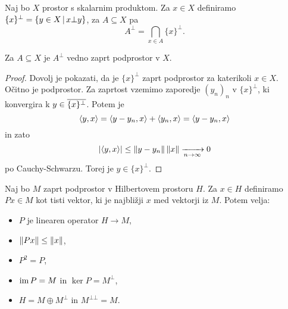 
\begin{definicija}
  Naj bo $X$ prostor s skalarnim produktom.
  Za $x \in X$ definiramo $\{x\}^\bot = \{y \in X \,|\, x \bot y\}$, za $A
  \subseteq X$ pa
  \[
	A^\bot = \bigcap_{x \in A} \{x\}^\bot.
  \]
\end{definicija}

\begin{lema}
  Za $A \subseteq X$ je $A^\bot$ vedno zaprt podprostor v $X$.
\end{lema}

\begin{proof}
  Dovolj je pokazati, da je $\{x\}^\bot$ zaprt podprostor za katerikoli $x \in
  X$.
  Očitno je podprostor.
  Za zaprtost vzemimo zaporedje $(y_n)_n$ v $\{x\}^\bot$, ki konvergira k $y \in
  \overline{\{x\}^\bot}$.
  Potem je
  \[
	\left< y,x \right> = \left< y - y_n, x \right> + \left< y_n, x \right> = \left< y - y_n, x \right>
  \]
  in zato
  \[
	\left| \left< y, x \right> \right| \le \left\lVert y - y_n\right\rVert \left\lVert x\right\rVert \xrightarrow[n \to \infty]{} 0
  \]
  po Cauchy-Schwarzu.
  Torej je $y \in \{x\}^\bot$.
\end{proof}


\begin{izrek}
  Naj bo $M$ zaprt podprostor v Hilbertovem prostoru $H$.
  Za $x \in H$ definiramo $Px \in M$ kot tisti vektor, ki je najbližji $x$ med
  vektorji iz $M$.
  Potem velja:
  \begin{itemize}
  \item $P$ je linearen operator $H \to M$,
  \item $\left\lVert Px\right\rVert \le \left\lVert x\right\rVert$,
  \item $P^2 = P$,
  \item $\operatorname{im} P = M$ in $\ker P = M^\bot$,
  \item $H = M \oplus M^\bot$ in $M^{\bot \bot} = M$.
  \end{itemize}
\end{izrek}

